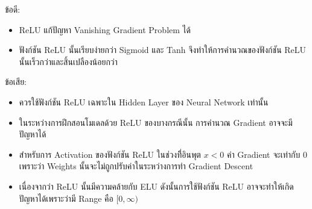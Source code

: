 \noindent ข้อดี:
\begin{itemize}[topsep=0pt,noitemsep]\setlength\itemsep{0.5em}
  \item ReLU แก้ปัญหา Vanishing Gradient Problem ได้

  \item ฟังก์ชัน ReLU นั้นเรียบง่ายกว่า Sigmoid และ Tanh จึงทำให้การคำนวณของฟังก์ชัน ReLU นั้นเร็วกว่าและสิ้นเปลืองน้อยกว่า
\end{itemize}
%
ข้อเสีย:
\begin{itemize}[topsep=0pt,noitemsep]\setlength\itemsep{0.5em}
  \item ควรใช้ฟังก์ชัน ReLU เฉพาะใน Hidden Layer ของ Neural Network เท่านั้น

  \item ในระหว่างการฝึกสอนโมเดลด้วย ReLU ของบางกรณีนั้น การคำนวณ Gradient อาจจะมีปัญหาได้

  \item สำหรับการ Activation ของฟังก์ชัน ReLU ในช่วงที่ิอินพุต $x < 0$ ค่า Gradient จะเท่ากับ 0 เพราะว่า Weights
        นั้นจะไม่ถูกปรับค่าในระหว่างการทำ Gradient Descent

  \item เนื่องจากว่า ReLU นั้นมีความคล้ายกับ ELU ดังนั้นการใช้ฟังก์ชัน ReLU อาจจะทำให้เกิดปัญหาได้เพราะว่ามี Range คือ
        $[0,\infty)$
\end{itemize}
%
